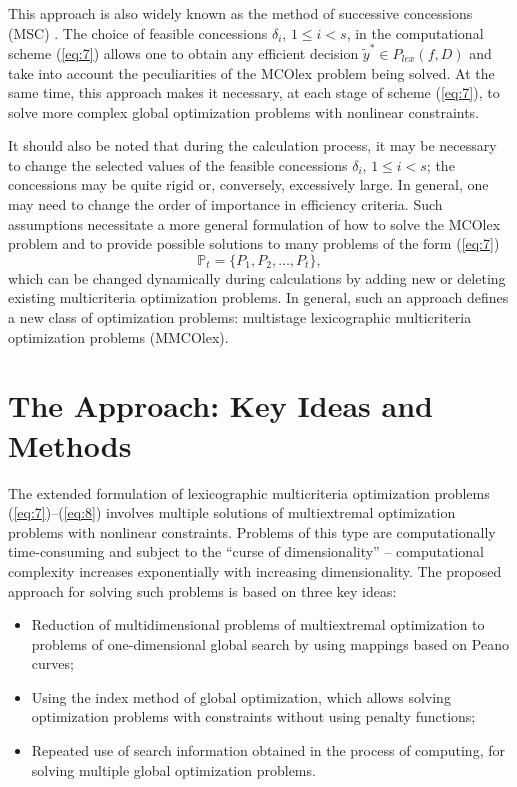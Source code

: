 \documentclass[smallextended]{svjour3}       %
\begin{document}
This approach is also widely known as the method of successive concessions (MSC) \cite{c3,c4,c5}. The choice of feasible concessions $\delta_i$, $1 \leq i < s$, in the computational scheme (\ref{eq:7}) allows one to obtain any efficient decision $\widetilde{y}^* \in P_{lex}(f,D)$ and take into account the peculiarities of the MCOlex problem being solved. At the same time, this approach makes it necessary, at each stage of scheme (\ref{eq:7}), to solve more complex global optimization problems with nonlinear constraints.

It should also be noted that during the calculation process, it may be necessary to change the selected values of the feasible concessions $\delta_i$, $1 \leq i < s$; the concessions may be quite rigid or, conversely, excessively large. In general, one may need to change the order of importance in efficiency criteria. Such assumptions necessitate a more general formulation of how to solve the MCOlex problem and to provide possible solutions to many problems of the form (\ref{eq:7})
\begin{equation}\label{eq:8}
\mathbb{P}_t=\{ P_1,P_2,\dots,P_t\},
\end{equation}
which can be changed dynamically during calculations by adding new or deleting existing multicriteria optimization problems. In general, such an approach defines a new class of optimization problems: multistage lexicographic multicriteria optimization problems (MMCOlex).

\section{The Approach: Key Ideas and Methods}
\label{sec:3}

The extended formulation of lexicographic multicriteria optimization problems (\ref{eq:7})--(\ref{eq:8}) involves multiple solutions of multiextremal optimization problems with nonlinear constraints. Problems of this type are computationally time-consuming and subject to the ``curse of dimensionality'' -- computational complexity increases exponentially with increasing dimensionality. The proposed approach for solving such problems is based on three key ideas:
\begin{itemize}
  \item Reduction of multidimensional problems of multiextremal optimization to problems of one-dimensional global search by using mappings based on Peano curves;
  \item Using the index method of global optimization, which allows solving optimization problems with constraints without using penalty functions;
  \item Repeated use of search information obtained in the process of computing, for solving multiple global optimization problems.
\end{itemize}
\end{document}
